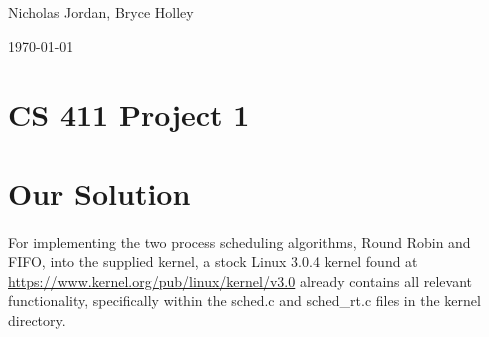 \documentclass[letterpaper,10pt]{article}
\def\name{Nicholas Jordan, Bryce Holley}
\begin{document}
\hfill \name

\hfill \today

\section*{CS 411 Project 1}
\section*{Our Solution}
\paragraph{} 
For implementing the two process scheduling algorithms, Round Robin and FIFO, into the supplied kernel, a stock Linux 3.0.4 kernel found at \url{https://www.kernel.org/pub/linux/kernel/v3.0}
already contains all relevant functionality, specifically within the sched.c and sched\_rt.c files in the kernel directory.
\end{document}

